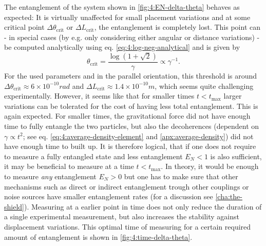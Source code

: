 The entanglement of the system shown in \cref{fig:4:EN-delta-theta} behaves as expected: It is virtually unaffected for small placement variations and at some critical point $\Delta \theta_\mathrm{crit}$ or $\Delta L_\mathrm{crit}$, the entanglement is completely lost.
This point can - in special cases (by e.g. only considering either angular or distance variations) - be computed analytically using eq. \eqref{eq:4:log-neg-analytical} and is given by
\begin{equation}\label{eq:4:theta-crit-analytical}
  \theta_\mathrm{crit} = \frac{\log(1 + \sqrt{2})}{\gamma} \propto \gamma^{-1} .
\end{equation}
For the used parameters and in the parallel orientation, this threshold is around $\Delta \theta_\mathrm{crit} \approx 6 \times 10^{-10} \si{rad}$ and $\Delta L_\mathrm{crit} \approx 1.4 \times 10^{-10} \si{m}$, which seems quite challenging experimentally.
However, it seems like that for smaller times $t<t_\mathrm{max}$ larger variations can be tolerated for the cost of having less total entanglement.
This is again expected. For smaller times, the gravitational force did not have enough time to fully entangle the two particles, but also the decoherences (dependent on $\gamma \propto t^2$; see eq. \eqref{eq:4:average-density-element} and \cref{apx:average-density}) did not have enough time to built up. 
It is therefore logical, that if one does not require to measure a fully entangled state and less entanglement $E_N < 1$ is also sufficient, it may be beneficial to measure at a time $t < t_\mathrm{max}$. In theory, it would be enough to measure \textit{any} entanglement $E_N > 0$ but one has to make sure that other mechanisms such as direct or indirect entanglement trough other couplings or noise sources have smaller entanglement rates (for a discussion see \cref{cha:the-shield}). 
Measuring at a earlier point in time does not only reduce the duration of a single experimental measurement, but also increases the stability against displacement variations. This optimal time of measuring for a certain required amount of entanglement is shown in \cref{fig:4:time-delta-theta}.
